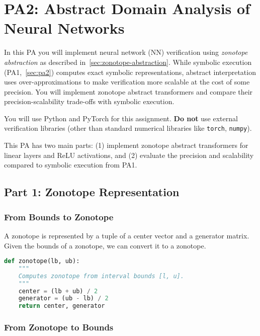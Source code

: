 \section{PA2: Abstract Domain Analysis of Neural Networks}\label{sec:pa2}

In this PA you will implement neural network (NN) verification using \emph{zonotope abstraction} as described in~\autoref{sec:zonotope-abstraction}. While symbolic execution (PA1,~\autoref{sec:pa2}) computes exact symbolic representations, abstract interpretation uses over-approximations to make verification more scalable at the cost of some precision. You will implement zonotope abstract transformers and compare their precision-scalability trade-offs with symbolic execution.

You will use Python and PyTorch for this assignment. \textbf{Do not} use external verification libraries (other than standard numerical libraries like \texttt{torch}, \texttt{numpy}).

This PA has two main parts: (1) implement zonotope abstract transformers for linear layers and ReLU activations, and (2) evaluate the precision and scalability compared to symbolic execution from PA1.


\subsection{Part 1: Zonotope Representation}

\subsubsection{From Bounds to Zonotope}

A zonotope is represented by a tuple of a center vector and a generator matrix. 
Given the bounds of a zonotope, we can convert it to a zonotope.
\begin{lstlisting}[language=Python]
def zonotope(lb, ub):
    """
    Computes zonotope from interval bounds [l, u].
    """
    center = (lb + ub) / 2
    generator = (ub - lb) / 2
    return center, generator
\end{lstlisting}

\subsubsection{From Zonotope to Bounds}

